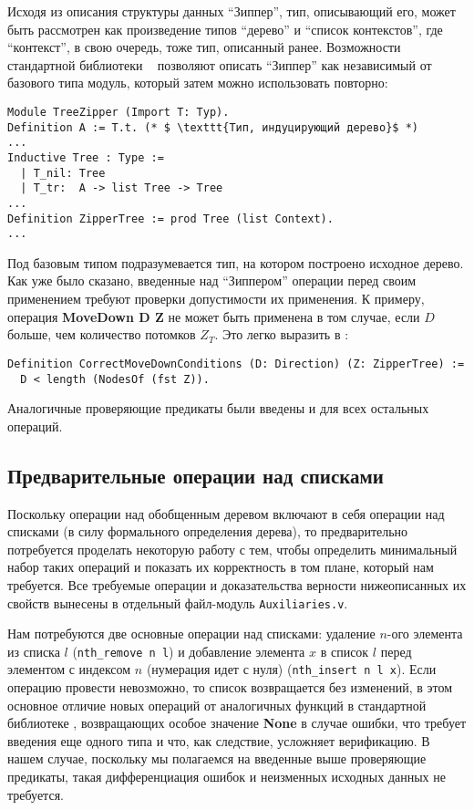 Исходя из описания структуры данных ``Зиппер'', тип, описывающий его, может быть рассмотрен как произведение типов ``дерево'' и ``список контекстов'', где ``контекст'', в свою очередь, тоже тип, описанный ранее. Возможности стандартной библиотеки \tcoq~ позволяют описать ``Зиппер'' как независимый от базового типа модуль, который затем можно использовать повторно:

\begin{lstlisting}
Module TreeZipper (Import T: Typ).
Definition A := T.t. (* $ \texttt{Тип, индуцирующий дерево}$ *)
...
Inductive Tree : Type :=
  | T_nil: Tree
  | T_tr:  A -> list Tree -> Tree
...
Definition ZipperTree := prod Tree (list Context).
...
\end{lstlisting}

Под базовым типом подразумевается тип, на котором построено исходное дерево. Как уже было сказано, введенные над ``Зиппером'' операции перед своим применением требуют проверки допустимости их применения. К примеру, операция \textbf{MoveDown D Z} не может быть применена в том случае, если $D$ больше, чем количество потомков $Z_T$. Это легко выразить в \tcoq:
\begin{lstlisting}
Definition CorrectMoveDownConditions (D: Direction) (Z: ZipperTree) :=
  D < length (NodesOf (fst Z)).
\end{lstlisting}
Аналогичные проверяющие предикаты были введены и для всех остальных операций.

\subsection{Предварительные операции над списками}

Поскольку операции над обобщенным деревом включают в себя операции над списками (в силу формального определения дерева), то предварительно потребуется проделать некоторую работу с тем, чтобы определить минимальный набор таких операций и показать их корректность в том плане, который нам требуется. Все требуемые операции и доказательства верности нижеописанных их свойств вынесены в отдельный файл-модуль \texttt{Auxiliaries.v}.

Нам потребуются две основные операции над списками: удаление $n$-ого элемента из списка $l$ (\texttt{nth\_remove n l}) и добавление элемента $x$ в список $l$ перед элементом с индексом $n$ (нумерация идет с нуля) (\texttt{nth\_insert n l x}). Если операцию провести невозможно, то список возвращается без изменений, в этом основное отличие новых операций от аналогичных функций в стандартной библиотеке \tcoq, возвращающих особое значение \textbf{None} в случае ошибки, что требует введения еще одного типа и что, как следствие, усложняет верификацию. В нашем случае, поскольку мы полагаемся на введенные выше проверяющие предикаты, такая дифференциация ошибок и неизменных исходных данных не требуется.

